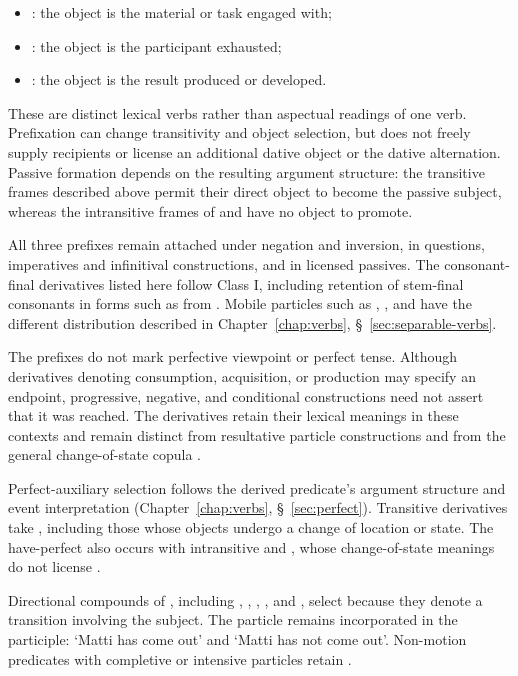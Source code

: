 \begin{itemize}
    \item {}: the object is the material or task engaged with;
    \item {}: the object is the participant exhausted;
    \item {}: the object is the result produced or developed.
\end{itemize}

These are distinct lexical verbs rather than aspectual readings of one verb. Prefixation can change transitivity and object selection, but does not freely supply recipients or license an additional dative object or the dative alternation. Passive formation depends on the resulting argument structure: the transitive frames described above permit their direct object to become the passive subject, whereas the intransitive frames of  and  have no object to promote.

All three prefixes remain attached under negation and inversion, in questions, imperatives and infinitival constructions, and in licensed passives. The consonant-final derivatives listed here follow Class I, including retention of stem-final consonants in forms such as  from . Mobile particles such as , , and  have the different distribution described in Chapter~\ref{chap:verbs}, \S~\ref{sec:separable-verbs}.

The prefixes do not mark perfective viewpoint or perfect tense. Although derivatives denoting consumption, acquisition, or production may specify an endpoint, progressive, negative, and conditional constructions need not assert that it was reached. The derivatives retain their lexical meanings in these contexts and remain distinct from resultative particle constructions and from the general change-of-state copula .

Perfect-auxiliary selection follows the derived predicate's argument structure and event interpretation (Chapter~\ref{chap:verbs}, \S~\ref{sec:perfect}). Transitive derivatives take , including those whose objects undergo a change of location or state. The have-perfect also occurs with intransitive  and , whose change-of-state meanings do not license .

Directional compounds of , including , , , , and , select  because they denote a transition involving the subject. The particle remains incorporated in the participle:  `Matti has come out' and  `Matti has not come out'. Non-motion predicates with completive or intensive particles retain .

